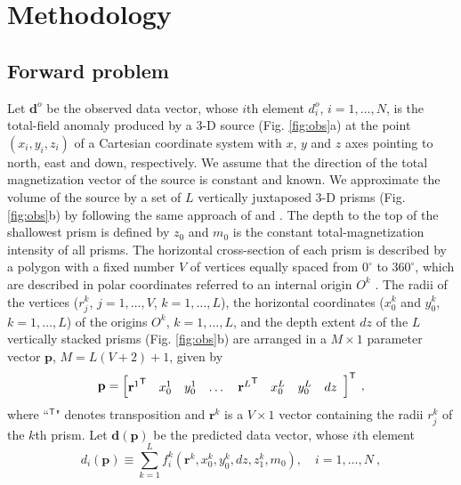 \section{Methodology}\label{sec:metodo}

\subsection{Forward problem}

Let $\mathbf{d}^{o}$ be the observed data vector, whose $i$th element $d^{o}_{i}$, $i = 1, \dots, N$, is the total-field 
anomaly produced by a 3-D source (Fig. \ref{fig:obs}a) at the point $(x_{i}, y_{i}, z_{i})$ of a Cartesian coordinate 
system with $x$, $y$ and $z$ axes pointing to north, east and down, respectively. We assume that the direction of the 
total magnetization vector of the source is constant and known. 
We approximate the volume of the source by a set of $L$ vertically juxtaposed 3-D prisms 
(Fig. \ref{fig:obs}b) by following the same approach of \cite{oliveirajr-etal2011} and \cite{oliveirajr-barbosa2013}. 
The depth to the top of the shallowest prism is defined by $z_{0}$ and $m_{0}$ is the constant total-magnetization 
intensity of all prisms. 
The horizontal cross-section of each prism is described by a polygon with a fixed number 
$V$ of vertices equally spaced from $0^{\circ}$ to $360^{\circ}$, which are described in polar coordinates 
referred to an internal origin $O^{k}$ . 
The radii of the vertices ($r^{k}_{j}$, $j=1,\dots , V$, $k=1,\dots ,L$), the horizontal coordinates ($x_{0}^{k}$ and $y_{0}^{k}$, $k=1,\dots ,L$) 
of the origins $O^{k}$, $k=1,\dots ,L$, and the depth extent $dz$ of the $L$ vertically stacked prisms (Fig. \ref{fig:obs}b) are arranged in a 
$M \times 1$ parameter vector $\mathbf{p}$, $M = L (V + 2) + 1$, given by
\begin{equation}
\mathbf{p} = \left[ \begin{array}{@{}*{12}{c}@{}}
{\mathbf{r}^{1}}^{\mathsf{T}} & x_{0}^{1} & y_{0}^{1} & \dots & {\mathbf{r}^{L}}^{\mathsf{T}} & x_{0}^{L} & y_{0}^{L} & dz \\
\end{array} \right]^{\mathsf{T}} \: ,
\label{eq:p-vector}
\end{equation}
where ``$^{\mathsf{T}}$" denotes transposition and $\mathbf{r}^{k}$ is a $V \times 1$ vector containing the radii $r^{k}_{j}$ 
of the $k$th prism.
Let $\mathbf{d} (\mathbf{p})$ be the predicted data vector, whose $i$th element 
\begin{equation}
d_{i} (\mathbf{p}) \equiv \sum\limits_{k=1}^{L} f_{i}^{k}(\mathbf{r}^{k}, x_{0}^{k}, y_{0}^{k}, dz, z_{1}^{k}, m_{0}), \quad i = 1, \dots, N \: ,
\label{eq:predicted-data-i}
\end{equation}
